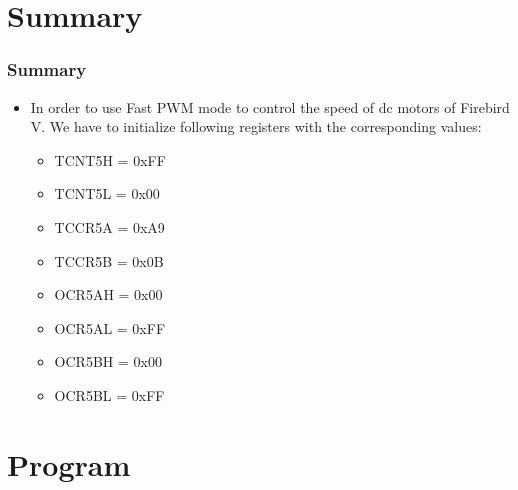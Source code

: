 \documentclass[table,10pt,red]{beamer}	%
\begin{document}
\section{Summary}
\begin{frame}
\frametitle{Summary}
 \begin{itemize}
 	\item <+-|alert@+> In order to use Fast PWM mode to control the speed of dc motors of Firebird V. We have to initialize following registers with the corresponding values:
 		\begin{itemize}
 	\item[\checkmark]
 	\pause
 	TCNT5H  = 0xFF 
 	\item[\checkmark]
 	\pause
 	TCNT5L = 0x00 
	\item[\checkmark]
	\pause
	TCCR5A  = 0xA9
	\item[\checkmark]
	\pause 
	TCCR5B = 0x0B 
	\item[\checkmark]
	\pause 
	OCR5AH = 0x00 
	\item[\checkmark]
	\pause 
	OCR5AL = 0xFF
	\item[\checkmark]
	\pause 
	OCR5BH = 0x00 
	\item[\checkmark]
	\pause
	OCR5BL = 0xFF
	 \end{itemize}
	
\end{itemize}
\end{frame}
\section{Program}
\end{document}
